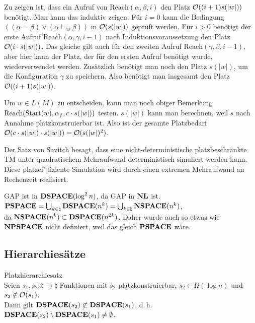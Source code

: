 \begin{Beweis}
    Zu zeigen ist, dass ein Aufruf von $\text{Reach}(\alpha, \beta, i)$ den Platz
    $\mathcal{O}((i + 1) s(|w|))$ benötigt.
    Man kann das induktiv zeigen:
    Für $i = 0$ kann die Bedingung
    $((\alpha = \beta) \lor (\alpha \vdash_M \beta))$ in $\mathcal{O}(s(|w|))$ geprüft werden.
    Für $i > 0$ benötigt der erste Aufruf $\text{Reach}(\alpha, \gamma, i - 1)$ nach
    Induktionsvoraussetzung den Platz $\mathcal{O}(i \cdot s(|w|))$.
    Das gleiche gilt auch für den zweiten Aufruf $\text{Reach}(\gamma, \beta, i - 1)$,
    aber hier kann der Platz, der für den ersten Aufruf benötigt wurde, wiederverwendet werden.
    Zusätzlich benötigt man noch den Platz $s(|w|)$, um die Konfiguration $\gamma$ zu speichern.
    Also benötigt man insgesamt den Platz $\mathcal{O}((i + 1) s(|w|))$.
    
    Um $w \in L(M)$ zu entscheiden, kann man noch obiger Bemerkung
    $\text{Reach}(\text{Start}(w), \alpha_f, c \cdot s(|w|))$ testen.
    $s(|w|)$ kann man berechnen, weil $s$ nach Annahme platzkonstruierbar ist.
    Also ist der gesamte Platzbedarf
    $\mathcal{O}(c \cdot s(|w|) \cdot s(|w|)) = \mathcal{O}(s(|w|)^2)$.
\end{Beweis}

\linie
\pagebreak

\begin{Bem}
    Der Satz von Savitch besagt, dass eine nicht-deterministische platzbeschränkte TM unter
    quadratischem Mehraufwand deterministisch simuliert werden kann.
    Diese platzef"|fiziente Simulation wird durch einen extremen Mehraufwand an Rechenzeit
    realisiert.
\end{Bem}

\begin{Kor}
    GAP ist in $\mathbf{DSPACE}(\log^2 n)$, da GAP in $\mathbf{NL}$ ist.\\
    $\mathbf{PSPACE} = \bigcup_{k \in \natural} \mathbf{DSPACE}(n^k) =
    \bigcup_{k \in \natural} \mathbf{NSPACE}(n^k)$,\\
    da $\mathbf{NSPACE}(n^k) \subset \mathbf{DSPACE}(n^{2k})$.
    Daher wurde auch so etwas wie $\mathbf{NPSPACE}$ nicht definiert, weil das gleich $\mathbf{PSPACE}$ wäre.
\end{Kor}

\subsection{%
    Hierarchiesätze%
}

\begin{Satz}{Platzhierarchiesatz}\\
    Seien $s_1, s_2\colon \natural \rightarrow \natural$ Funktionen mit
    $s_2$ platzkonstruierbar, $s_2 \in \Omega(\log n)$ und $s_2 \notin \mathcal{O}(s_1)$.\\
    Dann gilt $\mathbf{DSPACE}(s_2) \not\subset \mathbf{DSPACE}(s_1)$, d.\,h.
    $\mathbf{DSPACE}(s_2) \setminus \mathbf{DSPACE}(s_1) \not= \emptyset$.
\end{Satz}

